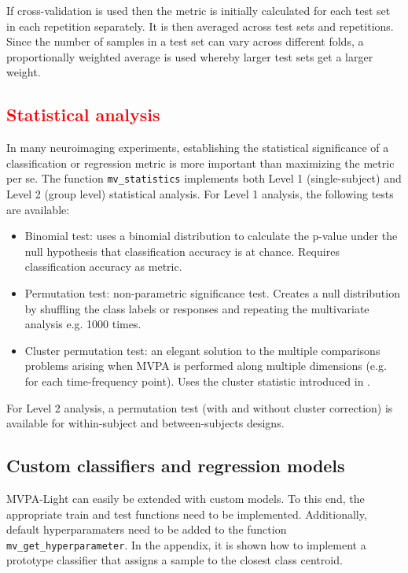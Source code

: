 \documentclass[utf8]{frontiersSCNS} %
\newcommand{\ttt}[1]{\texttt{#1}}
\newcommand{\red}[1]{\textcolor{red}{#1}}
\begin{document}
If cross-validation is used then the metric is initially calculated for each test set in each repetition separately. It is then averaged across test sets and repetitions. Since the number of samples in a test set can vary across different folds, a proportionally weighted average is used whereby larger test sets get a larger weight.

\red{\subsection{Statistical analysis}\label{sec:statistics}}

In many neuroimaging experiments, establishing the statistical significance of a classification or regression metric is more important than maximizing the metric per se. The function \ttt{mv\_statistics} implements both Level 1 (single-subject) and Level 2 (group level) statistical analysis. For Level 1 analysis, the following tests are available:

\begin{itemize}
    \item Binomial test: uses a binomial distribution to calculate the p-value under the null hypothesis that classification accuracy is at chance. Requires classification accuracy as metric.
    \item Permutation test: non-parametric significance test. Creates a null distribution by shuffling the class labels or responses and repeating the multivariate analysis e.g. 1000 times. 
    \item Cluster permutation test: an elegant solution to the multiple comparisons problems arising when MVPA is performed along multiple dimensions (e.g. for each time-frequency point). Uses the cluster statistic introduced in 
    \cite{Maris2007}.
\end{itemize}

For Level 2 analysis, a permutation test (with and without cluster correction) is available for within-subject and between-subjects designs.

\subsection{Custom classifiers and regression models}

MVPA-Light can easily be extended with custom models. To this end, the appropriate train and test functions need to be implemented. Additionally, default hyperparamaters need to be added to the function \ttt{mv\_get\_hyperparameter}. In the appendix, it is shown how to implement a prototype classifier that assigns a sample to the closest class centroid.
\end{document}
